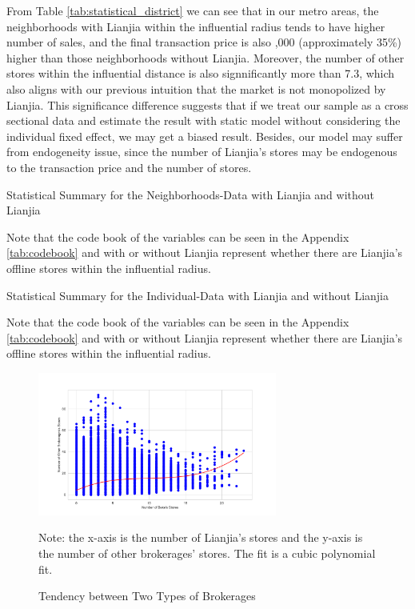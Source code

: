 \documentclass[11pt]{article}
\begin{document}
From Table \ref{tab:statistical_district} we can see that in our metro areas, the neighborhoods with Lianjia within the influential radius tends to have higher number of sales, and the final transaction price is also ,000 (approximately 35\%) higher than those neighborhoods without Lianjia. Moreover, the number of other stores within the influential distance is also signnificantly more than 7.3, which also aligns with our previous intuition that the market is not monopolized by Lianjia. This significance difference suggests that if we treat our sample as a cross sectional data and estimate the result with static model without considering the individual fixed effect, we may get a biased result. Besides, our model may suffer from endogeneity issue, since the number of Lianjia's stores may be endogenous to the transaction price and the number of stores. 

\begin{table}[htb!]
    \centering
    \begin{tiny}
    \caption{Statistical Summary for the Neighborhoods-Data with Lianjia and without Lianjia}
    
    \label{tab:statistical_district}

    Note that the code book of the variables can be seen in the Appendix \ref{tab:codebook} and with or without Lianjia represent whether there are Lianjia's offline stores within the influential radius.
    \end{tiny}
\end{table}

\begin{table}[htb!]
  \centering
  \begin{tiny}
  \caption{Statistical Summary for the Individual-Data with Lianjia and without Lianjia}
  
  \label{tab:statistical_individual}

  Note that the code book of the variables can be seen in the Appendix \ref{tab:codebook} and with or without Lianjia represent whether there are Lianjia's offline stores within the influential radius.
  \end{tiny}  
\end{table}

\begin{figure}
    \centering
    \includegraphics[width=0.7\textwidth]{../figures/scatter_plot_with_two_brokerages.pdf}
    \caption{Tendency between Two Types of Brokerages}
    \label{fig:same_distribution}
    Note: the x-axis is the number of Lianjia's stores and the y-axis is the number of other brokerages' stores. The fit is a cubic polynomial fit.
\end{figure}
\end{document}
